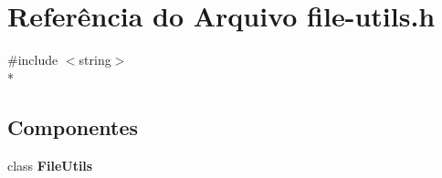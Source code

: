 \section{Referência do Arquivo file-\/utils.h}
\label{file-utils_8h}
{\ttfamily \#include $<$string$>$}\\*
\subsection*{Componentes}
\begin{DoxyCompactItemize}
\item 
class {\bf File\+Utils}
\end{DoxyCompactItemize}
